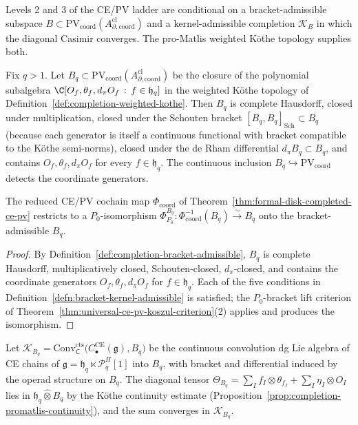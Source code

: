 Levels 2 and 3 of the CE/PV ladder are conditional on a
bracket-admissible subspace
\(B\subset\mathrm{PV}_{\mathrm{coord}}(A^{\mathrm{cl}}_{\partial,\mathrm{coord}})\)
and a kernel-admissible completion \(\mathcal K_B\) in which the
diagonal Casimir converges.  The pro-Matlis weighted
K\"othe topology supplies both.

\begin{defn}
\label{def:completion-bracket-admissible}
Fix \(q>1\).  Let
\(B_q\subset\mathrm{PV}_{\mathrm{coord}}(A^{\mathrm{cl}}_{\partial,\mathrm{coord}})\)
be the closure of the polynomial subalgebra
\(\C[O_f,\theta_f,d_\pi O_f\,:\,f\in\mathfrak h_q]\) in the
weighted K\"othe topology of
Definition~\ref{def:completion-weighted-kothe}.  Then \(B_q\) is
complete Hausdorff, closed under multiplication, closed under the
Schouten bracket
\([B_q,B_q]_{\mathrm{Sch}}\subset B_q\) (because each generator is
itself a continuous functional with bracket compatible to the
K\"othe semi-norms), closed under the de Rham differential
\(d_\pi B_q\subset B_q\), and contains \(O_f,\theta_f,d_\pi O_f\)
for every \(f\in\mathfrak h_q\).  The continuous inclusion
\(B_q\hookrightarrow\mathrm{PV}_{\mathrm{coord}}\) detects the
coordinate generators.
\end{defn}

\begin{thm}
\label{thm:completion-p0-lift}
The reduced CE/PV cochain map
\(\Phi_{\mathrm{coord}}\) of
Theorem~\ref{thm:formal-disk-completed-ce-pv} restricts to a
\(P_0\)-isomorphism
\(\Phi^{B_q}_{P_0}:\Phi^{-1}_{\mathrm{coord}}(B_q)\xrightarrow{\sim}B_q\)
onto the bracket-admissible \(B_q\).
\end{thm}

\begin{proof}
By Definition~\ref{def:completion-bracket-admissible},
\(B_q\) is complete Hausdorff, multiplicatively closed,
Schouten-closed, \(d_\pi\)-closed, and contains the coordinate
generators \(O_f,\theta_f,d_\pi O_f\) for \(f\in\mathfrak h_q\).
Each of the five conditions in
Definition~\ref{defn:bracket-kernel-admissible} is satisfied; the
\(P_0\)-bracket lift criterion of
Theorem~\ref{thm:universal-ce-pv-koszul-criterion}(2) applies and
produces the isomorphism.
\end{proof}

\begin{defn}
\label{def:completion-kernel-admissible}
Let \(\mathcal K_{B_q}=\mathrm{Conv}^{\mathrm{cts}}_{\mathsf C}
\bigl(C^{\mathrm{CE}}_\bullet(\mathfrak g),B_q\bigr)\) be the
continuous convolution dg Lie algebra of CE chains of
\(\mathfrak g=\mathfrak h_q\ltimes\mathcal P^\Pi_q[1]\) into
\(B_q\), with bracket and differential induced by the operad
structure on \(B_q\).  The diagonal tensor
\(\Theta_{B_q}=\sum_If_I\otimes\theta_{f_I}+
\sum_I\eta_I\otimes O_I\) lies in
\(\mathfrak h_q\widehat\otimes B_q\) by the K\"othe continuity
estimate
(Proposition~\ref{prop:completion-promatlis-continuity}), and the
sum converges in \(\mathcal K_{B_q}\).
\end{defn}

